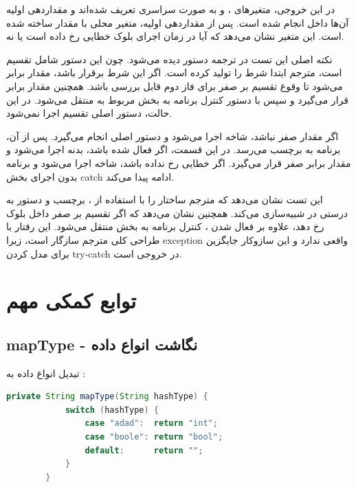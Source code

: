 \documentclass[12pt]{report}
\begin{document}
	در این خروجی، متغیرهای ،  و  به صورت سراسری تعریف شده‌اند و مقداردهی اولیه آن‌ها داخل  انجام شده است. 
	پس از مقداردهی اولیه، متغیر محلی  با مقدار  ساخته شده است. 
	این متغیر نشان می‌دهد که آیا در زمان اجرای بلوک  خطایی رخ داده است یا نه.
	
	نکته اصلی این تست در ترجمه دستور  دیده می‌شود. 
	چون این دستور شامل تقسیم است، مترجم ابتدا شرط  را تولید کرده است. 
	اگر این شرط برقرار باشد، مقدار  برابر  می‌شود تا وقوع تقسیم بر صفر برای فاز دوم قابل بررسی باشد. 
	همچنین مقدار  برابر  قرار می‌گیرد و سپس با دستور  کنترل برنامه به بخش مربوط به  منتقل می‌شود. 
	در این حالت، دستور اصلی تقسیم اجرا نمی‌شود.
	
	اگر مقدار  صفر نباشد، شاخه  اجرا می‌شود و دستور اصلی  انجام می‌گیرد. 
	پس از آن، برنامه به برچسب  می‌رسد. 
	در این قسمت، اگر  فعال شده باشد، بدنه  اجرا می‌شود و مقدار  برابر صفر قرار می‌گیرد. 
	اگر خطایی رخ نداده باشد، شاخه  اجرا می‌شود و برنامه بدون اجرای بخش catch ادامه پیدا می‌کند.
	
	این تست نشان می‌دهد که مترجم ساختار  را با استفاده از ، برچسب  و دستور  به درستی در  شبیه‌سازی می‌کند. 
	همچنین نشان می‌دهد که اگر تقسیم بر صفر داخل بلوک  رخ دهد، علاوه بر فعال شدن ، کنترل برنامه به بخش  منتقل می‌شود. 
	این رفتار با طراحی کلی مترجم سازگار است، زیرا  exception واقعی ندارد و این سازوکار جایگزین برای مدل کردن try-catch در خروجی است.
	
	\chapter{توابع کمکی مهم}
	
	\section{mapType - نگاشت انواع داده}
	
	تبدیل انواع داده  به :
	
	\setLTR
	\begin{lstlisting}[language=Java]
		private String mapType(String hashType) {
			switch (hashType) {
				case "adad":  return "int";
				case "boole": return "bool";
				default:      return "";
			}
		}
	\end{lstlisting}
	\setRTL
	
\end{document}
